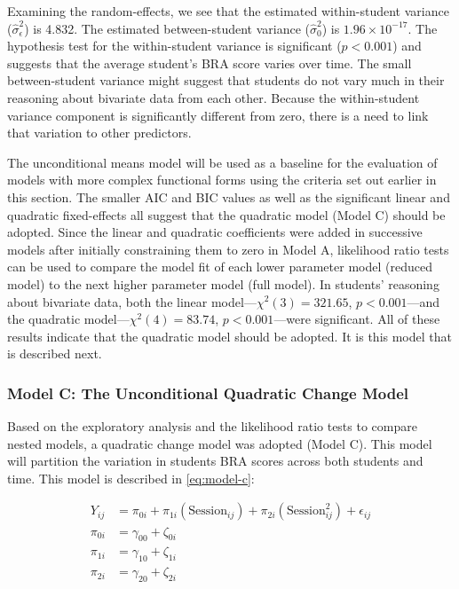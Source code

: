 \documentclass[11pt]{umnthesis}
\begin{document}
Examining the random-effects, we see that the estimated within-student variance
(\(\hat\sigma^2_{\epsilon}\)) is 4.832. The estimated between-student variance (\(\hat\sigma^2_{0}\)) is \(1.96 \times 10^{-17}\). The hypothesis test for the within-student variance is significant (\(p < 0.001\)) and suggests that the average student's BRA score varies over time. The small between-student variance might suggest that students do not vary much in their reasoning about bivariate data from each other. Because the within-student variance component is significantly different from zero, there is a need to link that variation to other predictors.

The unconditional means model will be used as a baseline for the evaluation of models with more complex functional forms using the criteria set out earlier in this section. The smaller AIC and BIC values as well as the significant linear and quadratic fixed-effects all suggest that the quadratic model (Model C) should be adopted. Since the linear and quadratic coefficients were added in successive models after initially constraining them to zero in Model A, likelihood ratio tests can be used to compare the model fit of each lower parameter model (reduced model) to the next higher parameter model (full model). In students' reasoning about bivariate data, both the linear model---\(\chi^2(3)=321.65\), \(p < 0.001\)---and the quadratic model---\(\chi^2(4)=83.74\), \(p < 0.001\)---were significant. All of these results indicate that the quadratic model should be adopted. It is this model that is described next.

\hypertarget{model-c-the-unconditional-quadratic-change-model}{%
\subsubsection*{Model C: The Unconditional Quadratic Change Model}\label{model-c-the-unconditional-quadratic-change-model}}

Based on the exploratory analysis and the likelihood ratio tests to compare nested models, a quadratic change model was adopted (Model C). This model will partition the variation in students BRA scores across both students and time. This model is described in \autoref{eq:model-c}:

\begin{equation}\label{eq:model-c}
\begin{split}
Y_{ij} &= \pi_{0i} + \pi_{1i}(\mathrm{Session}_{ij}) + \pi_{2i}(\mathrm{Session}_{ij}^2) + \epsilon_{ij}\\[2ex]
\pi_{0i} &= \gamma_{00} + \zeta_{0i}\\[1ex]
\pi_{1i} &= \gamma_{10} + \zeta_{1i}\\[1ex]
\pi_{2i} &= \gamma_{20} + \zeta_{2i}\\[1ex]
\end{split}
\end{equation}
\end{document}
